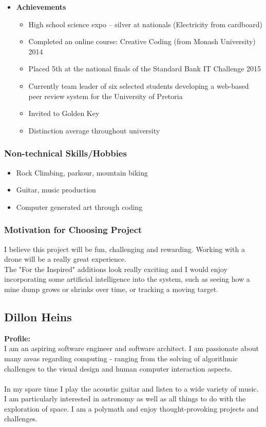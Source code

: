 \documentclass{article}
\begin{document}
\begin{itemize}
	\item \textbf{Achievements}
	\begin{itemize}
		\item High school science expo – silver at nationals (Electricity from cardboard)
		\item Completed an online course: Creative Coding (from Monash University) 2014
		\item Placed 5th at the national finals of the Standard Bank IT Challenge 2015
		\item Currently team leader of six selected students developing a web-based peer review system for the University of Pretoria
		\item Invited to Golden Key
		\item Distinction average throughout university
	\end{itemize}
\end{itemize}

\subsubsection{Non-technical Skills/Hobbies}
\begin{itemize}
	\item Rock Climbing, parkour, mountain biking
	\item Guitar, music production
	\item Computer generated art through coding
\end{itemize}
\subsubsection{Motivation for Choosing Project}
I believe this project will be fun, challenging and rewarding. Working with a drone will be a really great experience.\\

The "For the Inspired" additions look really exciting and I would enjoy incorporating some artificial intelligence into the system, such as seeing how a mine dump grows or shrinks over time, or tracking a moving target.

\cleardoublepage

\subsection{Dillon Heins}
\textbf{Profile:}\\
I am an aspiring software engineer and software architect. I am passionate about many areas regarding computing - ranging from the solving of algorithmic challenges to the visual design and human computer interaction aspects.
\\\\	
In my spare time I play the acoustic guitar and listen to a wide variety of music. I am particularly interested in astronomy as well as all things to do with the exploration of space. I am a polymath and enjoy thought-provoking projects and challenges.
\end{document}
